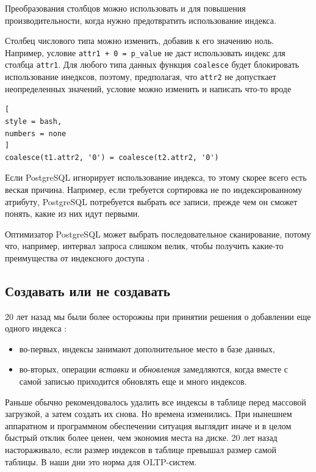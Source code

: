 \documentclass[%
	11pt,
	a4paper,
	utf8,
		]{article}
\begin{document}
Преобразования столбцов можно использовать и для повышения производительности, когда нужно предотвратить использование индекса.

Столбец числового типа можно изменить, добавив к его значению ноль. Например, условие \verb|attr1 + 0 = p_value| не даст использовать индекс для столбца \verb|attr1|. Для любого типа данных функция \verb|coalesce| будет блокировать использование инедксов, поэтому, предполагая, что \verb|attr2| не допусткает неопределенных значений, условие можно изменить и написать что-то вроде
\begin{lstlisting}[
style = bash,
numbers = none
]
coalesce(t1.attr2, '0') = coalesce(t2.attr2, '0')
\end{lstlisting}

Если PostgreSQL игнорирует использование индекса, то этому скорее всего есть веская причина. Например, если требуется сортировка не по индексированному атрибуту, PostgreSQL потребуется выбрать \emph{все} записи, прежде чем он сможет понять, какие из них идут первыми.

Оптимизатор PostgreSQL может выбрать последовательное сканирование, потому что, например, интервал запроса слишком велик, чтобы получить какие-то преимущества от индексного доступа \cite[]{dombrovskaya:postgresql-2022}.

\subsection{Создавать или не создавать}

20 лет назад мы были более осторожны при принятии решения о добавлении еще одного индекса \cite[]{dombrovskaya:postgresql-2022}:
\begin{itemize}
	\item во-первых, индексы занимают дополнительное место в базе данных,
	
	\item во-вторых, операции \emph{вставки} и \emph{обновления} замедляются, когда вместе с самой записью приходится обновлять еще и много индексов.
\end{itemize}

Раньше обычно рекомендовалось удалить все индексы в таблице перед массовой загрузкой, а затем создать их снова. Но времена изменились. При нынешнем аппаратном и программном обеспечении ситуация выглядит иначе и в целом быстрый отклик более ценен, чем экономия места на диске. 20 лет назад настораживало, если размер индексов в таблице превышал размер самой таблицы. В наши дни это норма для OLTP-систем.
\end{document}
